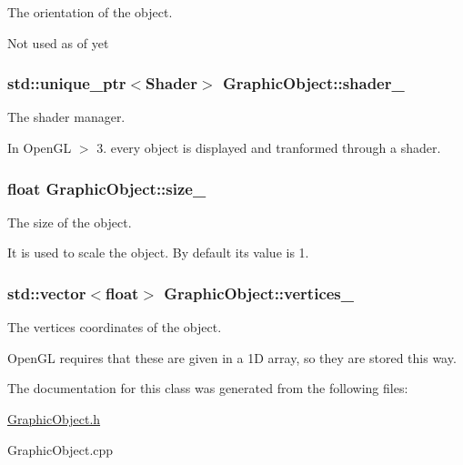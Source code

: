 The orientation of the object. 

Not used as of yet \hypertarget{classGraphicObject_a8ad07f4e11a71b5ed0d4fc66f14ab83e}{}
\subsubsection[{shader\+\_\+}]{\setlength{\rightskip}{0pt plus 5cm}std\+::unique\+\_\+ptr$<${\bf Shader}$>$ Graphic\+Object\+::shader\+\_\+\hspace{0.3cm}{\ttfamily [protected]}}\label{classGraphicObject_a8ad07f4e11a71b5ed0d4fc66f14ab83e}


The shader manager. 

In Open\+G\+L $>$ 3. every object is displayed and tranformed through a shader. \hypertarget{classGraphicObject_aaf5a021607b05779bd670fa912950bd1}{}
\subsubsection[{size\+\_\+}]{\setlength{\rightskip}{0pt plus 5cm}float Graphic\+Object\+::size\+\_\+\hspace{0.3cm}{\ttfamily [protected]}}\label{classGraphicObject_aaf5a021607b05779bd670fa912950bd1}


The size of the object. 

It is used to scale the object. By default its value is 1. \hypertarget{classGraphicObject_a911bfc9f48b22d0dbb3de68ff8a52ecf}{}
\subsubsection[{vertices\+\_\+}]{\setlength{\rightskip}{0pt plus 5cm}std\+::vector$<$float$>$ Graphic\+Object\+::vertices\+\_\+\hspace{0.3cm}{\ttfamily [protected]}}\label{classGraphicObject_a911bfc9f48b22d0dbb3de68ff8a52ecf}


The vertices coordinates of the object. 

Open\+G\+L requires that these are given in a 1\+D array, so they are stored this way. 

The documentation for this class was generated from the following files\+:\begin{DoxyCompactItemize}
\item 
\hyperlink{GraphicObject_8h}{Graphic\+Object.\+h}\item 
Graphic\+Object.\+cpp\end{DoxyCompactItemize}
